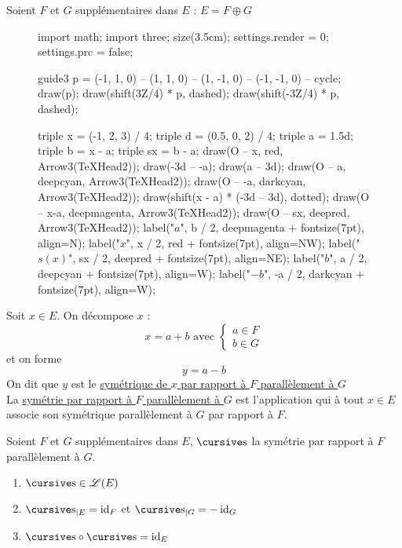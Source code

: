 \begin{defn}
	Soient $F$ et $G$ supplémentaires dans $E$ : $E = F \oplus G$ \\
	\begin{wrapfigure}
		{l}{5cm}
		\centering
		\vspace{-0.8cm}
		\begin{asy}
			import math;
			import three;
			size(3.5cm);
			settings.render = 0;
			settings.prc = false;

			guide3 p = (-1, 1, 0) -- (1, 1, 0) -- (1, -1, 0) -- (-1, -1, 0) -- cycle;
			draw(p);
			draw(shift(3Z/4) * p, dashed);
			draw(shift(-3Z/4) * p, dashed);

			triple x = (-1, 2, 3) / 4;
			triple d = (0.5, 0, 2) / 4;
			triple a = 1.5d;
			triple b = x - a;
			triple sx = b - a;
			draw(O -- x, red, Arrow3(TeXHead2));
			draw(-3d -- -a);
			draw(a -- 3d);
			draw(O -- a, deepcyan, Arrow3(TeXHead2));
			draw(O -- -a, darkcyan, Arrow3(TeXHead2));
			draw(shift(x - a) * (-3d -- 3d), dotted);
			draw(O -- x-a, deepmagenta, Arrow3(TeXHead2));
			draw(O -- sx, deepred, Arrow3(TeXHead2));
			label("$a$", b / 2, deepmagenta + fontsize(7pt), align=N);
			label("$x$", x / 2, red + fontsize(7pt), align=NW);
			label("$s(x)$", sx / 2, deepred + fontsize(7pt), align=NE);
			label("$b$", a / 2, deepcyan + fontsize(7pt), align=W);
			label("$-b$", -a / 2, darkcyan + fontsize(7pt), align=W);
		\end{asy}
		\vspace{1.5cm}
	\end{wrapfigure}
	Soit $x \in E$. On décompose $x$ : \[
		x = a + b \text{ avec } \begin{cases}
			 a \in F\\
			 b \in G
		\end{cases}
	\] et on forme \[
		y = a - b
	\] On dit que $y$ est le \underline{symétrique de $x$ par rapport à $F$ parallèlement à $G$}\\
	La \underline{symétrie par rapport à $F$ parallèlement à $G$} est l'application qui à tout $x \in E$ associe son symétrique parallèlement à $G$ par rapport à $F$.
\end{defn}

\begin{prop}
	Soient $F$ et $G$ supplémentaires dans $E$, $\s$ la symétrie par rapport à $F$ parallèlement à $G$.
	\begin{enumerate}
		\item $\s \in \mathcal{L}(E)$ 
		\item $\s_{|E} = \id_F$ et $\s_{|G} = -\id_G$
		\item $\s \circ \s = \id_{E}$
	\end{enumerate}
\end{prop}

